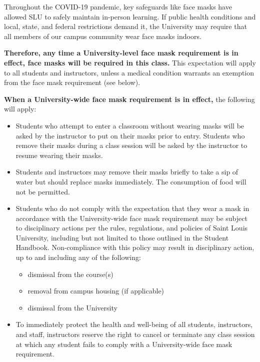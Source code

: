 \documentclass[
]{book}
\providecommand{\tightlist}{%
  \setlength{\itemsep}{0pt}\setlength{\parskip}{0pt}}
\begin{document}
Throughout the COVID-19 pandemic, key safeguards like face masks have allowed SLU to safely maintain in-person learning. If public health conditions and local, state, and federal restrictions demand it, the University may require that all members of our campus community wear face masks indoors.

\textbf{Therefore, any time a University-level face mask requirement is in effect, face masks will be required in this class.} This expectation will apply to all students and instructors, unless a medical condition warrants an exemption from the face mask requirement (see below).

\textbf{When a University-wide face mask requirement is in effect,} the following will apply:

\begin{itemize}
\tightlist
\item
  Students who attempt to enter a classroom without wearing masks will be asked by the instructor to put on their masks prior to entry. Students who remove their masks during a class session will be asked by the instructor to resume wearing their masks.
\item
  Students and instructors may remove their masks briefly to take a sip of water but should replace masks immediately. The consumption of food will not be permitted.
\item
  Students who do not comply with the expectation that they wear a mask in accordance with the University-wide face mask requirement may be subject to disciplinary actions per the rules, regulations, and policies of Saint Louis University, including but not limited to those outlined in the Student Handbook. Non-compliance with this policy may result in disciplinary action, up to and including any of the following:

  \begin{itemize}
  \tightlist
  \item
    dismissal from the course(s)
  \item
    removal from campus housing (if applicable)
  \item
    dismissal from the University
  \end{itemize}
\item
  To immediately protect the health and well-being of all students, instructors, and staff, instructors reserve the right to cancel or terminate any class session at which any student fails to comply with a University-wide face mask requirement.
\end{itemize}
\end{document}
